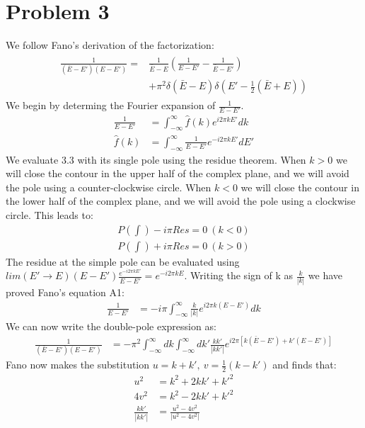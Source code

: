 \documentclass[a4paper,11pt]{article}
\numberwithin{equation}{section}
\newcommand{\pp}[1]{#1'}
\begin{document}
\section{Problem 3}
We follow Fano's derivation of the factorization:
\begin{align}
 \begin{split}
 \frac{1}{(\bar{E}-\pp{E})(E-\pp{E})} = &\frac{1}{\bar{E}-E}\left(\frac{1}{E-\pp{E}}-\frac{1}{\bar{E}-\pp{E}} \right)\\
				      &+\pi^2\delta(\bar{E}-E)\delta(\pp{E}-\frac{1}{2}(\bar{E}+E))
 \end{split}
\end{align}
We begin by determing the Fourier expansion of $\frac{1}{E-\pp{E}}$.
\begin{align}
 \frac{1}{E-\pp{E}} &= \int_{-\infty}^\infty\hat{f}(k)e^{i2\pi k\pp{E}}dk\\
 \hat{f}(k) &= \int_{-\infty}^\infty \frac{1}{E-\pp{E}}e^{-i2\pi k\pp{E}}d\pp{E}
\end{align}
We evaluate 3.3 with its single pole using the residue theorem. 
When $k>0$ we will close the contour in the upper half of the complex plane, and we will avoid the pole using a counter-clockwise circle. 
When $k<0$ we will close the contour in the lower half of the complex plane, and we will avoid the pole using a clockwise circle.
This leads to:
\begin{align}
 P(\int) -i\pi Res = 0 \ (k<0)\\
 P(\int) +i\pi Res = 0 \ (k>0)
\end{align}
The residue at the simple pole can be evaluated using $lim(\pp{E} \rightarrow E)(E-\pp{E})\frac{ e^{-i2\pi k\pp{E}} }{E-\pp{E}}=e^{-i2\pi kE}$.
Writing the sign of k as $\frac{k}{|k|}$ we have proved Fano's equation A1:
\begin{align}
 \frac{1}{E-\pp{E}} &= -i\pi\int_{-\infty}^\infty \frac{k}{|k|}e^{i2\pi k(E-\pp{E})}dk
\end{align}
We can now write the double-pole expression as:
\begin{align}
 \frac{1}{(\bar{E}-\pp{E})(E-\pp{E})} &= -\pi^2\int_{-\infty}^\infty dk \int_{-\infty}^\infty d\pp{k}
	      \frac{k\pp{k}}{|k\pp{k}|}e^{i2\pi [ k(\bar{E}-\pp{E})+\pp{k}(E-\pp{E})]}
\end{align}
Fano now makes the substitution $u=k+\pp{k},\ v=\frac{1}{2}(k-\pp{k})$ and finds that:
\begin{align}
 u^2 &= k^2+2k\pp{k}+\pp{k}^2\\
 4v^2 &= k^2-2k\pp{k}+\pp{k}^2\\
 \frac{k\pp{k}}{|k\pp{k}|} &= \frac{u^2-4v^2}{|u^2-4v^2|}
\end{align}
\end{document}
